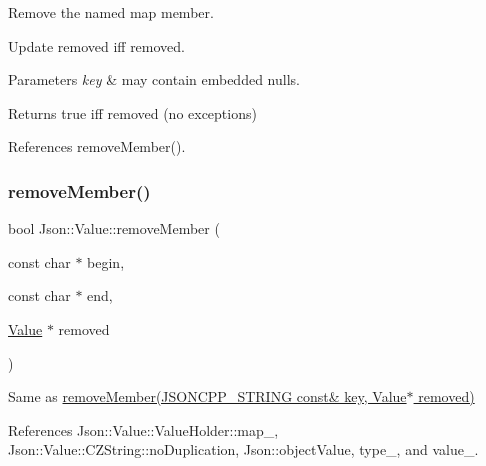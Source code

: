 Remove the named map member. 

Update \textquotesingle{}removed\textquotesingle{} iff removed. 
\begin{DoxyParams}{Parameters}
{\em key} & may contain embedded nulls. \\
\hline
\end{DoxyParams}
\begin{DoxyReturn}{Returns}
true iff removed (no exceptions) 
\end{DoxyReturn}


References remove\+Member().

\mbox{\label{classJson_1_1Value_a49c91af727d6b4eb0af02a81bb2def87_a49c91af727d6b4eb0af02a81bb2def87}} 
\subsubsection{\texorpdfstring{remove\+Member()}{removeMember()}\hspace{0.1cm}{\footnotesize\ttfamily [5/5]}}
{\footnotesize\ttfamily bool Json\+::\+Value\+::remove\+Member (\begin{DoxyParamCaption}\item[{const char $\ast$}]{begin,  }\item[{const char $\ast$}]{end,  }\item[{\hyperlink{classJson_1_1Value}{Value} $\ast$}]{removed }\end{DoxyParamCaption})}



Same as \hyperlink{classJson_1_1Value_ae385ecef98427970df525ee876e9f54a_ae385ecef98427970df525ee876e9f54a}{remove\+Member(\+J\+S\+O\+N\+C\+P\+P\+\_\+\+S\+T\+R\+I\+N\+G const\& key, Value$\ast$ removed)} 



References Json\+::\+Value\+::\+Value\+Holder\+::map\+\_\+, Json\+::\+Value\+::\+C\+Z\+String\+::no\+Duplication, Json\+::object\+Value, type\+\_\+, and value\+\_\+.

\mbox{\label{classJson_1_1Value_aa284353271ada427dbfa04a42f2be407_aa284353271ada427dbfa04a42f2be407}} 
